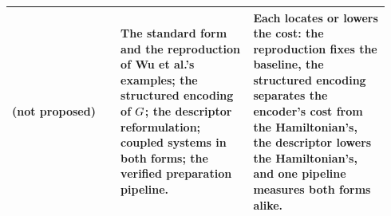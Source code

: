 \begin{table}[!htbp]
\begin{tabular}{@{}p{0.27\linewidth} p{0.33\linewidth} p{0.34\linewidth}@{}}
        \addlinespace
        (not proposed) & The standard form and the reproduction of Wu et al.'s examples; the structured encoding of $G$; the descriptor reformulation; coupled systems in both forms; the verified preparation pipeline. & Each locates or lowers the cost: the reproduction fixes the baseline, the structured encoding separates the encoder's cost from the Hamiltonian's, the descriptor lowers the Hamiltonian's, and one pipeline measures both forms alike. \\
        \bottomrule
    \end{tabular}
\end{table}

\FloatBarrier
